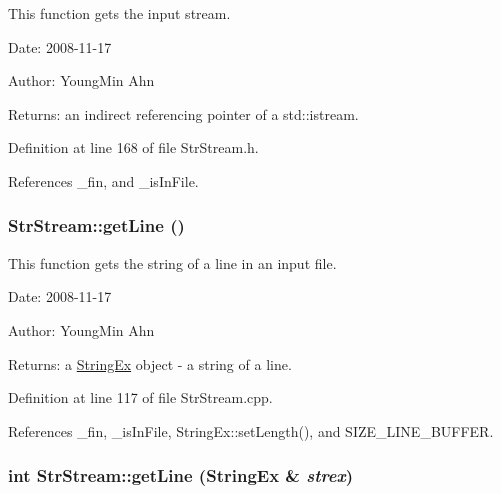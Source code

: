 This function gets the input stream. 

\begin{Desc}
\item[Date:]2008-11-17 \end{Desc}
\begin{Desc}
\item[Author:]YoungMin Ahn \end{Desc}
\begin{Desc}
\item[Returns:]an indirect referencing pointer of a std::istream. \end{Desc}


Definition at line 168 of file StrStream.h.

References \_\-fin, and \_\-isInFile.\hypertarget{classkmaOrange_1_1StrStream_2a65fe8f2e6a748e719f24a5ba415074}{
\subsubsection[{getLine}]{ StrStream::getLine ()}}
\label{classkmaOrange_1_1StrStream_2a65fe8f2e6a748e719f24a5ba415074}


This function gets the string of a line in an input file. 

\begin{Desc}
\item[Date:]2008-11-17 \end{Desc}
\begin{Desc}
\item[Author:]YoungMin Ahn \end{Desc}
\begin{Desc}
\item[Returns:]a \hyperlink{classStringEx}{StringEx} object - a string of a line. \end{Desc}


Definition at line 117 of file StrStream.cpp.

References \_\-fin, \_\-isInFile, StringEx::setLength(), and SIZE\_\-LINE\_\-BUFFER.\hypertarget{classkmaOrange_1_1StrStream_c61d2e7c94badd87624c973a1682096a}{
\subsubsection[{getLine}]{\setlength{\rightskip}{0pt plus 5cm}int StrStream::getLine ({\bf StringEx} \& {\em strex})}}
\label{classkmaOrange_1_1StrStream_c61d2e7c94badd87624c973a1682096a}


